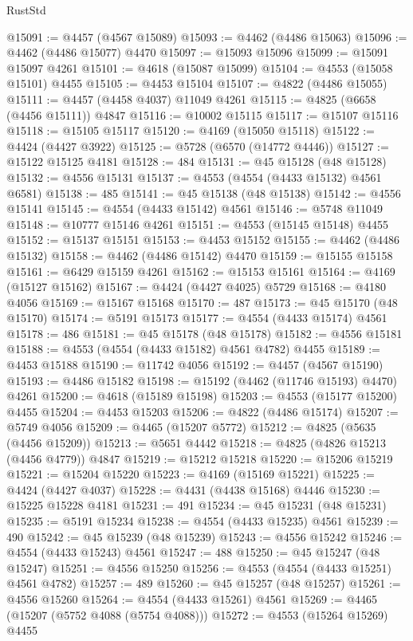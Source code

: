 \begin{lexlean}{RustStd}
\begin{coremodule}
@15091 := @4457 (@4567 @15089)
@15093 := @4462 (@4486 @15063)
@15096 := @4462 (@4486 @15077) @4470
@15097 := @15093 @15096
@15099 := @15091 @15097 @4261
@15101 := @4618 (@15087 @15099)
@15104 := @4553 (@15058 @15101) @4455
@15105 := @4453 @15104
@15107 := @4822 (@4486 @15055)
@15111 := @4457 (@4458 @4037) @11049 @4261
@15115 := @4825 (@6658 (@4456 @15111)) @4847
@15116 := @10002 @15115
@15117 := @15107 @15116
@15118 := @15105 @15117
@15120 := @4169 (@15050 @15118)
@15122 := @4424 (@4427 @3922)
@15125 := @5728 (@6570 (@14772 @4446))
@15127 := @15122 @15125 @4181
@15128 := 484
@15131 := @45 @15128 (@48 @15128)
@15132 := @4556 @15131
@15137 := @4553 (@4554 (@4433 @15132) @4561 @6581)
@15138 := 485
@15141 := @45 @15138 (@48 @15138)
@15142 := @4556 @15141
@15145 := @4554 (@4433 @15142) @4561
@15146 := @5748 @11049
@15148 := @10777 @15146 @4261
@15151 := @4553 (@15145 @15148) @4455
@15152 := @15137 @15151
@15153 := @4453 @15152
@15155 := @4462 (@4486 @15132)
@15158 := @4462 (@4486 @15142) @4470
@15159 := @15155 @15158
@15161 := @6429 @15159 @4261
@15162 := @15153 @15161
@15164 := @4169 (@15127 @15162)
@15167 := @4424 (@4427 @4025) @5729
@15168 := @4180 @4056
@15169 := @15167 @15168
@15170 := 487
@15173 := @45 @15170 (@48 @15170)
@15174 := @5191 @15173
@15177 := @4554 (@4433 @15174) @4561
@15178 := 486
@15181 := @45 @15178 (@48 @15178)
@15182 := @4556 @15181
@15188 := @4553 (@4554 (@4433 @15182) @4561 @4782) @4455
@15189 := @4453 @15188
@15190 := @11742 @4056
@15192 := @4457 (@4567 @15190)
@15193 := @4486 @15182
@15198 := @15192 (@4462 (@11746 @15193) @4470) @4261
@15200 := @4618 (@15189 @15198)
@15203 := @4553 (@15177 @15200) @4455
@15204 := @4453 @15203
@15206 := @4822 (@4486 @15174)
@15207 := @5749 @4056
@15209 := @4465 (@15207 @5772)
@15212 := @4825 (@5635 (@4456 @15209))
@15213 := @5651 @4442
@15218 := @4825 (@4826 @15213 (@4456 @4779)) @4847
@15219 := @15212 @15218
@15220 := @15206 @15219
@15221 := @15204 @15220
@15223 := @4169 (@15169 @15221)
@15225 := @4424 (@4427 @4037)
@15228 := @4431 (@4438 @15168) @4446
@15230 := @15225 @15228 @4181
@15231 := 491
@15234 := @45 @15231 (@48 @15231)
@15235 := @5191 @15234
@15238 := @4554 (@4433 @15235) @4561
@15239 := 490
@15242 := @45 @15239 (@48 @15239)
@15243 := @4556 @15242
@15246 := @4554 (@4433 @15243) @4561
@15247 := 488
@15250 := @45 @15247 (@48 @15247)
@15251 := @4556 @15250
@15256 := @4553 (@4554 (@4433 @15251) @4561 @4782)
@15257 := 489
@15260 := @45 @15257 (@48 @15257)
@15261 := @4556 @15260
@15264 := @4554 (@4433 @15261) @4561
@15269 := @4465 (@15207 (@5752 @4088 (@5754 @4088)))
@15272 := @4553 (@15264 @15269) @4455

\end{coremodule}
\end{lexlean}
